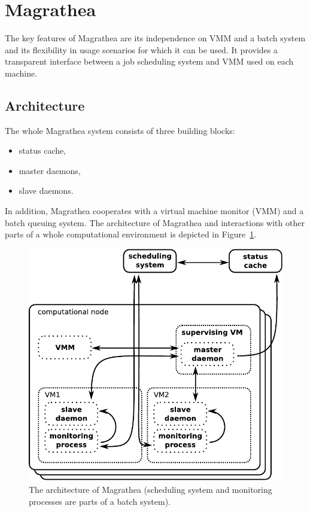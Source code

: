 \documentclass{sigplanconf}
\begin{document}
\section{Magrathea}
\label{sec:magrathea}

The key features of Magrathea are its independence on VMM and a batch system
and its flexibility in usage scenarios for which it can be used. It provides a
transparent interface between a job scheduling system and VMM used on each
machine.

\subsection{Architecture}

The whole Magrathea system consists of three building blocks:
\begin{itemize}
\item status cache,
\item master daemons,
\item slave daemons.
\end{itemize}

In addition, Magrathea cooperates with a virtual machine monitor (VMM) and
a batch queuing system. The architecture of Magrathea and interactions with
other parts of a whole computational environment is depicted in
Figure~\ref{fig:architecture}.

\begin{figure}[tb]
    \includegraphics[width=\columnwidth]{architecture}
    \caption{The architecture of Magrathea (scheduling system and monitoring
        processes are parts of a batch system).}
    \label{fig:architecture}
\end{figure}
\end{document}
